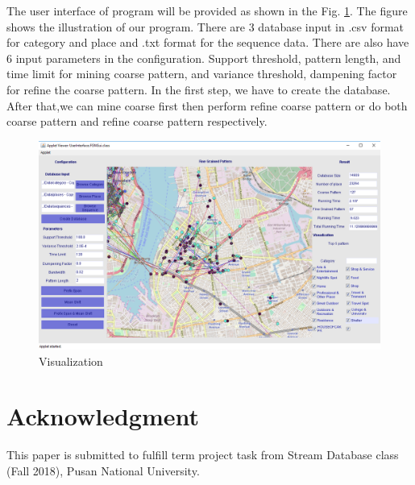\documentclass[conference]{IEEEtran}
\begin{document}
The user interface of program will be provided as shown in the Fig. \ref{fig:visual}. The figure shows the illustration of our program. There are 3 database input in .csv format for category and place and .txt format for the sequence data. There are also have 6 input parameters in the configuration. Support threshold, pattern length, and time limit for mining coarse pattern, and variance threshold, dampening factor for refine the coarse pattern. In the first step, we have to create the database. After that,we can mine coarse first then perform refine coarse pattern or do both coarse pattern and refine coarse pattern respectively.
\begin{figure}[!h]
	\centering
	\includegraphics[width=1\linewidth]{visual}
	\caption{Visualization}
	\label{fig:visual}
\end{figure}

\section*{Acknowledgment}
This paper is submitted to fulfill term project task from Stream Database class (Fall 2018), Pusan National University.



\end{document}
